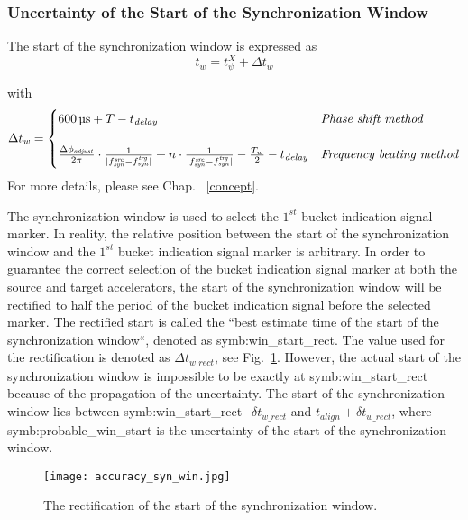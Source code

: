 \subsubsection{Uncertainty of the Start of the Synchronization Window}
\label{cal_start}
The start of the synchronization window is expressed as 
\begin{equation}
t_\mathit{w}=t_\psi^\mathit{X}+\Delta t_\mathit{w}\label{syn_win_start2}
\end{equation}

with 
\begin{eqnarray}
\Delta t_\mathit{w}=
\begin{cases}
\SI{600}{\us}+T-t_\mathit{delay}\ &\textit{Phase shift method}\cr
\cr
\frac{\Delta \phi_\mathit{adjust}}{2\pi}\cdot\frac{1}{|f_{\mathit{syn}}^\mathit{src}-f_{\mathit{syn}}^\mathit{trg}|}+n\cdot \frac{1}{|f_{\mathit{syn}}^\mathit{src}-f_{\mathit{syn}}^\mathit{trg}|}-\frac{T_w}{2}-t_\mathit{delay} & \textit{Frequency beating method}\cr
\end{cases}
\end{eqnarray}
For more details, please see Chap. ~\ref{concept}.

The synchronization window is used to select the $1^\mathit{st}$ bucket indication signal marker. In reality, the relative position between the start of the synchronization window and the $1^\mathit{st}$ bucket indication signal marker is arbitrary. In order to guarantee the correct selection of the bucket indication signal marker at both the source and target accelerators, the start of the synchronization window will be rectified to half the period of the bucket indication signal before the selected marker. The rectified start is called the ``best estimate time of the start of the synchronization window``, denoted as \gls{symb:win_start_rect}. The value used for the rectification is denoted as $\Delta t_\mathit{w\_rect}$, see Fig.~\ref{accuracy_syn_win}. However, the actual start of the synchronization window is impossible to be exactly at \gls{symb:win_start_rect} because of the propagation of the uncertainty. The start of the synchronization window lies between \gls{symb:win_start_rect}$-\delta t_\mathit{w\_rect}$ and $t_\mathit{align}+\delta t_\mathit{w\_rect}$, where \gls{symb:probable_win_start} is the uncertainty of the start of the synchronization window. 
\begin{figure}[!htb]
   \centering   
   \texttt{[image: accuracy\_syn\_win.jpg]}
   \caption{The rectification of the start of the synchronization window.}
   \label{accuracy_syn_win}
\end{figure}


